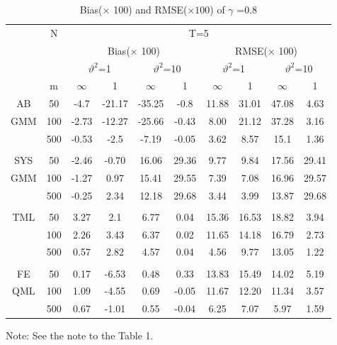 \documentclass[12pt,a4paper,hyperref]{article}
\begin{document}
\begin{center}
\begin{table}[H]
\caption{Bias($\times$ 100) and RMSE($\times 100$) of $\gamma$ =0.8} \label{table3}
\centering
\begin{tabular} {*{10}{c}}
\toprule
&N& \multicolumn{8}{c}{T=5}\\
\cmidrule(lr){3-10}
&& \multicolumn{4}{c}{Bias($\times$ 100)} & \multicolumn{4}{c}{RMSE($\times$ 100)}\\
  \cmidrule(lr){3-6} \cmidrule(lr){7-10}
&&  \multicolumn{2}{c}{$\vartheta^{2}$=1}&\multicolumn{2}{c}{$\vartheta^{2}$=10} & \multicolumn{2}{c}{$\vartheta^{2}$=1}&\multicolumn{2}{c}{$\vartheta^{2}$=10}\\
\cmidrule(lr){3-4} \cmidrule(lr){5-6}\cmidrule(lr){7-8}\cmidrule(lr){9-10}
& m & $\infty$ &1&$\infty$ &1&$\infty$ &1&$\infty$&1\\
\cmidrule(lr){3-4} \cmidrule(lr){5-6}\cmidrule(lr){7-8}\cmidrule(lr){9-10}
AB &50&	-4.7&-21.17	&-35.25&-0.8&11.88&31.01&47.08&4.63	 \\
GMM &100& -2.73 &-12.27&-25.66& -0.43 &8.00 & 21.12& 37.28&3.16 \\
&500&-0.53&	-2.5&	-7.19&-0.05&3.62&8.57&15.1&1.36 \\
\midrule \\
\cmidrule(lr){3-4} \cmidrule(lr){5-6}\cmidrule(lr){7-8}\cmidrule(lr){9-10}
 SYS&50&-2.46	&-0.70	&16.06	&29.36	&	9.77	&9.84	&17.56	&29.41
\\
  GMM& 100&-1.27	&0.97	&15.41&	29.55		&7.39&	7.08&	16.96&	29.57
\\
 &500&-0.25	&2.34	&12.18&	29.68	&	3.44&	3.99	&13.87&	29.68
 \\
 \midrule \\
\cmidrule(lr){3-4} \cmidrule(lr){5-6}\cmidrule(lr){7-8}\cmidrule(lr){9-10}
TML &50&3.27&2.1&6.77&0.04&15.36&16.53&18.82&3.94 \\
 &100 & 2.26& 3.43&6.37 &0.02 & 11.65&14.18 & 16.79&2.73 \\
 &500&0.57	&2.82&	4.57&0.04&4.56&9.77&13.05&1.22\\
 \midrule \\
\cmidrule(lr){3-4} \cmidrule(lr){5-6}\cmidrule(lr){7-8}\cmidrule(lr){9-10}
 FE &50&0.17&	-6.53	&0.48	&0.33	&13.83	&15.49	&14.02&5.19
\\
 QML & 100&1.09	&-4.55	&0.69	&-0.05	&11.67	&12.20&	11.34&	3.57
 \\
&500&0.67	&-1.01&	0.55	&-0.04&	6.25&	7.07&	5.97	&1.59
\\
\bottomrule
\end{tabular}
\begin{tablenotes}
      \small
      \item Note: See the note to the Table 1.
    \end{tablenotes}
\end{table}
\end{center}
\end{document}
